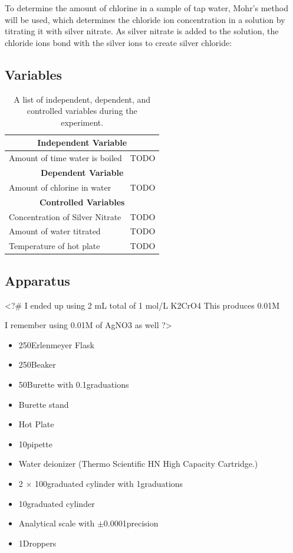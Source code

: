 \documentclass[11pt]{article}
\begin{document}
To determine the amount of chlorine in a sample of tap water, Mohr's method will be used, which determines the chloride ion concentration in a solution by titrating it with silver nitrate. As silver nitrate is added to the solution, the chloride ions bond with the silver ions to create silver chloride:

\centerline{}

\subsection{Variables}

\begin{table}[H]
	\def\arraystretch{1.5}
	\caption{A list of independent, dependent, and controlled variables during the experiment.}
	\begin{tabularx}{\linewidth}{|X|X|}
		\hline
		\multicolumn{2}{|c|}{\textbf{Independent Variable}}
		\\\hline
		Amount of time water is boiled  &
		TODO
		\\\hline
		\multicolumn{2}{|c|}{\centering \textbf{Dependent Variable}}
		\\\hline
		Amount of chlorine in water     &
		TODO
		\\\hline
		\multicolumn{2}{|c|}{\centering \textbf{Controlled Variables}}
		\\\hline
		Concentration of Silver Nitrate &
		TODO
		\\\hline
		Amount of water titrated        &
		TODO
		\\\hline
		Temperature of hot plate        &
		TODO
		\\\hline
	\end{tabularx}
\end{table}

\subsection{Apparatus}

<?#
I ended up using 2 mL total of 1 mol/L K2CrO4
This produces 0.01M

I remember using 0.01M of AgNO3 as well
?>

\begin{itemize}
	\item 250\ml Erlenmeyer Flask
	\item 250\ml Beaker
	\item 50\ml Burette with 0.1\ml graduations
	\item Burette stand
	\item Hot Plate
	\item 10\ml pipette
	\item Water deionizer (Thermo Scientific HN High Capacity Cartridge.)
	\item 2 $\times$ 100\ml graduated cylinder with 1\ml graduations
	\item 10\ml graduated cylinder
	\item Analytical scale with $\pm$0.0001\gram precision
	\item 1\ml Droppers
\end{itemize}
\end{document}
